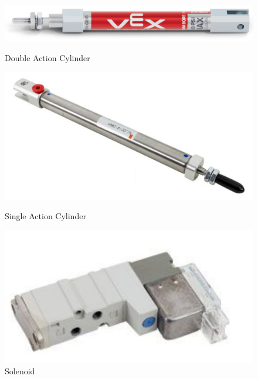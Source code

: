 \begin{figure}[hbt!] %
    \begin{minipage}{.5\textwidth}
        \centering
        \includegraphics[width=.8\linewidth]{images/Double Action Pneumatic Piston.png}
        \caption{Double Action Cylinder}
        \label{fig:double-action-pneumatic-piston}
    \end{minipage}
    \begin{minipage}{.5\textwidth}
        \centering
        \includegraphics[width=.8\linewidth]{images/Single Action Cylinder.jpg}
        \caption{Single Action Cylinder}
        \label{fig:single-action-cylinder}
    \end{minipage}
    \begin{minipage}{.5\textwidth}
        \centering
        \includegraphics[width=.8\linewidth]{images/Solenoid.jpg}
        \caption{Solenoid}
        \label{fig:solenoid}
    \end{minipage}
    \begin{minipage}{.5\textwidth}
        \centering

\end{minipage}
\end{figure}
